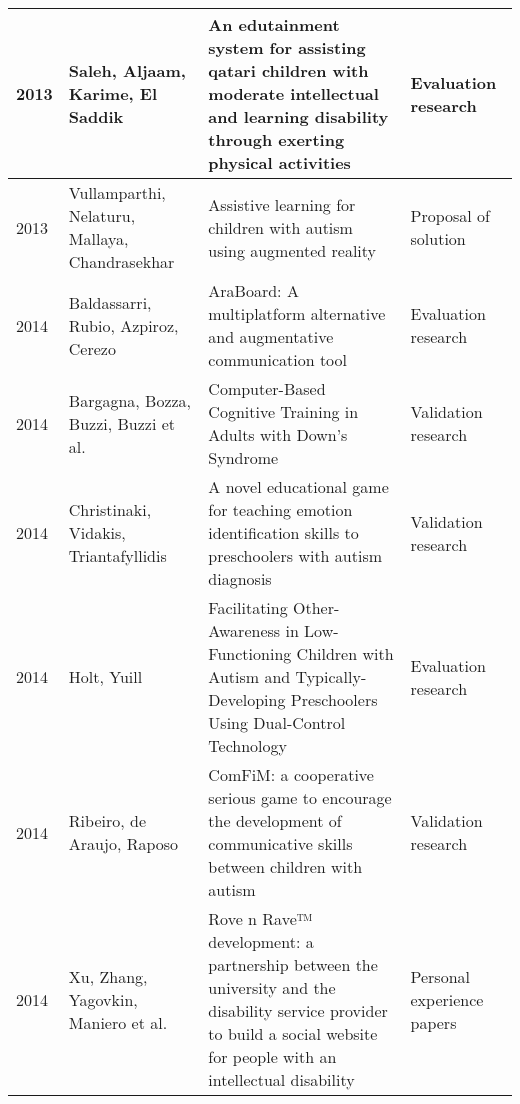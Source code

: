\documentclass[utf8,english]{gradu3}
\begin{document}
\begin{longtable}{|>{\scriptsize}l|>{\scriptsize}p{3cm}|>{\scriptsize}p{8cm}|>{\scriptsize}p{2.4cm}|}
  2013          & Saleh, Aljaam, Karime, El Saddik                                     & An edutainment system for assisting qatari children with moderate intellectual and learning disability through exerting physical activities                                                  & Evaluation research        \\ \hline
  2013          & Vullamparthi, Nelaturu, Mallaya, Chandrasekhar                       & Assistive learning for children with autism using augmented reality                                                                                                                          & Proposal of solution       \\ \hline
  2014          & Baldassarri, Rubio, Azpiroz, Cerezo                                  & AraBoard: A multiplatform alternative and augmentative communication tool                                                                                                                    & Evaluation research        \\ \hline
  2014          & Bargagna, Bozza, Buzzi, Buzzi et al.                                 & Computer-Based Cognitive Training in Adults with Down’s Syndrome                                                                                                                             & Validation research        \\ \hline
  2014          & Christinaki, Vidakis, Triantafyllidis                                & A novel educational game for teaching emotion identification skills to preschoolers with autism diagnosis                                                                                    & Validation research        \\ \hline
  2014          & Holt, Yuill                                                          & Facilitating Other-Awareness in Low-Functioning Children with Autism and Typically-Developing Preschoolers Using Dual-Control Technology                                                     & Evaluation research        \\ \hline
  2014          & Ribeiro, de Araujo, Raposo                                           & ComFiM: a cooperative serious game to encourage the development of communicative skills between children with autism                                                                         & Validation research        \\ \hline
  2014          & Xu, Zhang, Yagovkin, Maniero et al.                                  & Rove n Rave™ development: a partnership between the university and the disability service provider to build a social website for people with an intellectual disability                      & Personal experience papers \\ \hline

\end{longtable}
\end{document}
